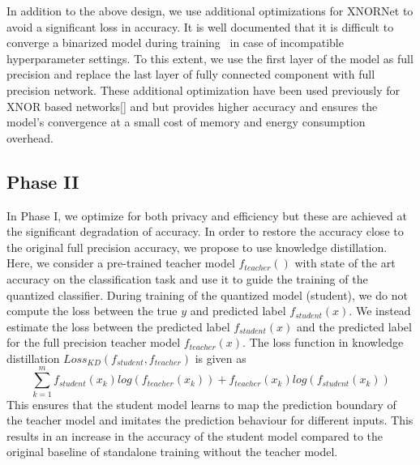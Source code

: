 In addition to the above design, we use additional optimizations for XNORNet to avoid a significant loss in accuracy.
It is well documented that it is difficult to converge a binarized model during training~\cite{AAAI1714619} in case of incompatible hyperparameter settings.
To this extent, we use the first layer of the model as full precision and replace the last layer of fully connected component with full precision network.
These additional optimization have been used previously for XNOR based networks[] and but provides higher accuracy and ensures the model's convergence at a small cost of memory and energy consumption overhead.



\subsection{Phase II}

In Phase I, we optimize for both privacy and efficiency but these are achieved at the significant degradation of accuracy.
In order to restore the accuracy close to the original full precision accuracy, we propose to use knowledge distillation.
Here, we consider a pre-trained teacher model $f_{teacher}()$ with state of the art accuracy on the classification task and use it to guide the training of the quantized classifier.
During training of the quantized model (student), we do not compute the loss between the true $y$ and predicted label $f_{student}(x)$.
We instead estimate the loss between the predicted label $f_{student}(x)$ and the predicted label for the full precision teacher model $f_{teacher}(x)$.
The loss function in knowledge distillation $Loss_{KD} (f_{student}, f_{teacher})$ is given as
\begin{equation}
\sum _{k=1}^m f_{student}(x_k)log(f_{teacher}(x_k)) + f_{teacher}(x_k)log(f_{student}(x_k))
\end{equation}
%
This ensures that the student model learns to map the prediction boundary of the teacher model and imitates the prediction behaviour for different inputs.
This results in an increase in the accuracy of the student model compared to the original baseline of standalone training without the teacher model.
